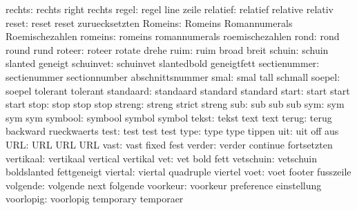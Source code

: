              rechts:  rechts               right               rechts
              regel:  regel                line                zeile
           relatief:  relatief             relative            relativ
              reset:  reset                reset               zuruecksetzten
            Romeins:  Romeins              Romannumerals       Roemischezahlen
            romeins:  romeins              romannumerals       roemischezahlen
               rond:  rond                 round               rund
             roteer:  roteer               rotate              drehe
               ruim:  ruim                 broad               breit
             schuin:  schuin               slanted             geneigt
          schuinvet:  schuinvet            slantedbold         geneigtfett
       sectienummer:  sectienummer         sectionnumber       abschnittsnummer
               smal:  smal                 tall                schmall
             soepel:  soepel               tolerant            tolerant
          standaard:  standaard            standard            standard
              start:  start                start               start
               stop:  stop                 stop                stop
             streng:  streng               strict              streng
                sub:  sub                  sub                 sub
                sym:  sym                  sym                 sym
            symbool:  symbool              symbol              symbol
              tekst:  tekst                text                text
              terug:  terug                backward            rueckwaerts
               test:  test                 test                test
               type:  type                 type                tippen
                uit:  uit                  off                 aus
                URL:  URL                  URL                 URL 
               vast:  vast                 fixed               fest
             verder:  verder               continue            fortsetzten
          vertikaal:  vertikaal            vertical            vertikal
                vet:  vet                  bold                fett
          vetschuin:  vetschuin            boldslanted         fettgeneigt
            viertal:  viertal              quadruple           viertel
               voet:  voet                 footer              fusszeile
           volgende:  volgende             next                folgende
           voorkeur:  voorkeur             preference          einstellung
          voorlopig:  voorlopig            temporary           temporaer

